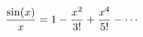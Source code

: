 \documentclass[preview]{standalone}
\begin{document}
\begin{align*}
\special{dvisvgm:raw <g id='unique000'>}\frac{\sin(x)}{x} = 1 - \frac{x^2}{3!} + \frac{x^4}{5!} - \cdots\special{dvisvgm:raw </g>}
\end{align*}
\end{document}
